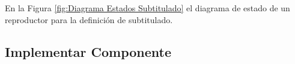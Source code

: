 \begin{minipage}{1.0\textwidth}
	\centering
	\label{fig:Formulario Registro Transcripción}
\end{minipage}

En la Figura \ref{fig:Diagrama Estados Subtitulado} el diagrama de estado de
un reproductor para la definición de subtitulado.

\begin{minipage}{1.0\textwidth}
	\centering
	\label{fig:Diagrama Estados Subtitulado}
\end{minipage}

\subsection{Implementar Componente}


